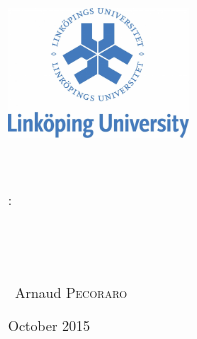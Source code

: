 \begin{titlepage}
\thispagestyle{empty}
\begin{center}

\begin{minipage}[t]{0.48\textwidth}
  \begin{flushleft}
    \includegraphics [width=48mm]{images/logo-univ.jpg} \\[0.5cm]

  \end{flushleft}
\end{minipage}
\begin{minipage}[t]{0.48\textwidth}
  \begin{flushright}

  \end{flushright}
\end{minipage} \\[1.0cm] %

\vspace{5.3cm}

\textsc{\Large \reportsubject :}\\[2cm]

\HRule \\[0.4cm]
{\Large \bfseries \reporttitle}\\[0.4cm]
\HRule \\[1.5cm]

\vspace{1.5cm}

\vspace{4.5cm}
\begin{minipage}[t]{0.30\textwidth}
  \begin{flushleft} \normalsize
     ~Arnaud \textsc{Pecoraro} \\
 \end{flushleft}
\end{minipage}
\begin{minipage}[t]{0.6\textwidth}
  \begin{flushright} \normalsize

  \end{flushright}
\end{minipage}

\vfill
\vspace*{0.440cm}
{\large October 2015 }

\end{center}
\end{titlepage}
